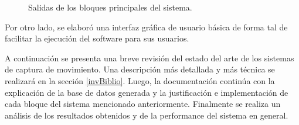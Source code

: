 \begin{figure}[H]
  \caption{Salidas de los bloques principales del sistema.}
      \label{ejemplotutiintro}
\end{figure}

Por otro lado, se elaboró una interfaz gráfica de usuario básica de forma tal de facilitar la ejecución del software para sus usuarios.

A continuación se presenta una breve revisión del estado del arte de los sistemas de captura de movimiento. Una descripción más detallada y más técnica se realizará en la sección \ref{invBiblio}. Luego, la documentación continúa con la explicación de la base de datos generada y la justificación e implementación de cada bloque del sistema mencionado anteriormente. Finalmente se realiza un análisis de los resultados obtenidos y de la performance del sistema en general.

